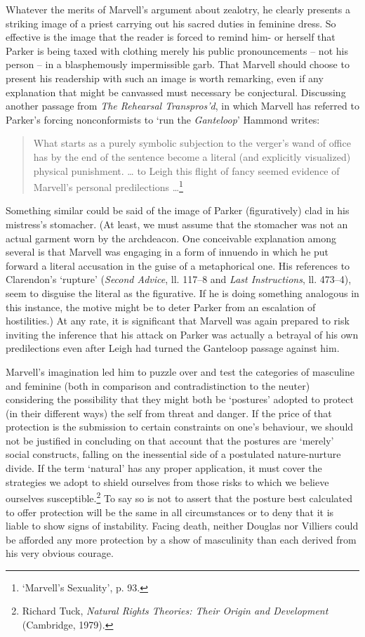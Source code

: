 ﻿\documentclass[12pt]{article}
\newcommand{\citedtitle}[1]{\textit{#1}}
\begin{document}
Whatever
the merits of Marvell’s argument about zealotry, he clearly presents a striking
image of a priest carrying out his sacred duties in feminine dress. So
effective is the image that the reader is forced to remind him- or herself that
Parker is being taxed with clothing merely his public pronouncements – not his
person – in a blasphemously impermissible garb. That Marvell should choose to
present his readership with such an image is worth remarking, even if any
explanation that might be canvassed must necessary be conjectural. Discussing
another passage from \citedtitle{The Rehearsal Transpros’d}, in which Marvell has
referred to Parker’s forcing nonconformists to ‘run the \emph{Ganteloop}’ Hammond writes:

\begin{quote}
What starts as a purely symbolic subjection to the verger’s wand of office has by the
end of the sentence become a literal (and explicitly visualized) physical punishment. … to Leigh this flight of fancy seemed evidence of Marvell’s personal predilections …\footnote{‘Marvell’s Sexuality’, p. 93.}
\end{quote}

Something
similar could be said of the image of Parker (figuratively) clad in his
mistress’s stomacher. (At least, we must assume that the stomacher was not an
actual garment worn by the archdeacon. One conceivable explanation among
several is that Marvell was engaging in a form of innuendo in which he put
forward a literal accusation in the guise of a metaphorical one. His references
to Clarendon’s ‘rupture’ (\citedtitle{Second Advice}, ll. 117–8 and \citedtitle{Last
Instructions},
ll. 473–4), seem to disguise the literal as the figurative. If he is doing
something analogous in this instance, the motive might be to deter Parker from
an escalation of hostilities.) At any rate, it is significant that Marvell was
again prepared to risk inviting the inference that his attack on Parker was
actually a betrayal of his own predilections even after Leigh had turned the
Ganteloop passage against him.

Marvell’s
imagination led him to puzzle over and test the categories of masculine and
feminine (both in comparison and contradistinction to the neuter) considering
the possibility that they might both be ‘postures’ adopted to protect (in their
different ways) the self from threat and danger. If the price of that
protection is the submission to certain constraints on one’s behaviour, we
should not be justified in concluding on that account that the postures are
‘merely’ social constructs, falling on the inessential side of a postulated
nature-nurture divide. If the term ‘natural’ has any proper application, it
must cover the strategies we adopt to shield ourselves from those risks to
which we believe ourselves susceptible.\footnote{Richard Tuck, \citedtitle{Natural Rights Theories: Their Origin and Development} (Cambridge, 1979).}
To say so is not to assert that the posture best calculated to offer protection
will be the same in all circumstances or to deny that it is liable to show
signs of instability. Facing death, neither Douglas nor Villiers could be
afforded any more protection by a show of masculinity than each derived from
his very obvious courage.
\end{document}
